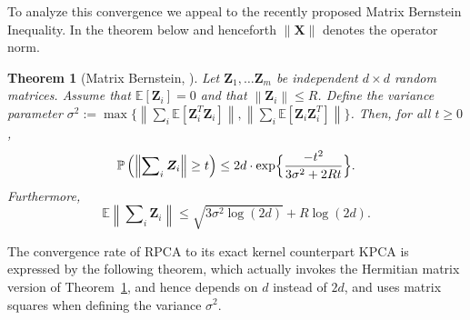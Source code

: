 \documentclass{article}
\newcommand{\E}{\mathbb{E}}
\newcommand{\norm}[1]{\left\|#1\right\|}
\newcommand{\nlsum}{\sum\nolimits}
\newtheorem{theorem}{Theorem}
\begin{document}
  To analyze this convergence we appeal to the recently proposed Matrix
  Bernstein Inequality. In the theorem below and henceforth $\|\bm X\|$ denotes
  the operator norm.
  \begin{theorem}[Matrix Bernstein, \citep{Tropp14}]\label{thm:bernstein} Let
  $\bm Z_1,\ldots \bm Z_m$ be independent $d\times d$ random matrices. Assume
  that $\E[\bm Z_i]=0$ and that $\norm{\bm Z_i} \le R$. Define the variance
  parameter $\sigma^2 := \max\bigl\lbrace \norm{\sum\nolimits_i
  \E[\bm{Z}_i^T\bm{Z}_i]}, \norm{\sum\nolimits_i
  \E[\bm{Z}_i\bm{Z}_i^T]}\bigr\rbrace$.  Then, for all $t \ge 0$,
  \begin{equation*}
    \mathbb{P}\left(\norm{\sum\nolimits_i\bm Z_i} \geq t\right)
    \leq 2d \cdot \exp\Bigl\lbrace\frac{-t^2}{3\sigma^2+2Rt}\Bigr\rbrace.
  \end{equation*}
  Furthermore,
  \begin{equation*}
    \mathbb{E}\norm{\nlsum_i\bm Z_i} \leq   \sqrt{3\sigma^2\log(2d)}+ R\log(2d).
  \end{equation*}
  \end{theorem}
  The convergence rate of RPCA to its exact kernel counterpart KPCA is
  expressed by the following  theorem, which actually invokes the Hermitian
  matrix version of Theorem~\ref{thm:bernstein}, and hence depends on $d$
  instead of $2d$, and uses matrix squares when defining the variance
  $\sigma^2$.
\end{document}
